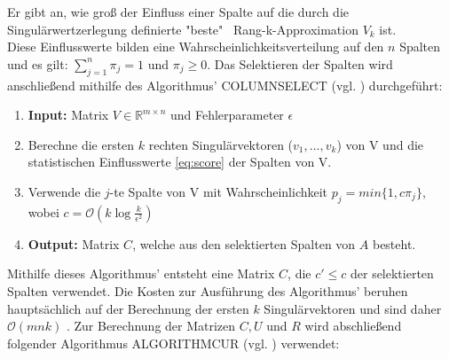 \documentclass[12pt,a4paper,twoside]{article}
\begin{document}
		Er gibt an, wie groß der Einfluss einer Spalte auf die durch die Singulärwertzerlegung definierte "beste" \ Rang-k-Approximation $V_k$ ist. \\
		Diese Einflusswerte bilden eine Wahrscheinlichkeitsverteilung auf den $n$ Spalten und es gilt: $\sum_{j=1}^n\pi_j=1$ und $\pi_j\geq 0$. \newline
		Das Selektieren der Spalten wird anschließend mithilfe des Algorithmus' COLUMNSELECT (vgl. \citep{mahoney2008}) durchgeführt: 
		\begin{enumerate}
			\item \textbf{Input:} Matrix $V\in \mathds{R}^{m\times n}$ und Fehlerparameter $\epsilon$
			\item Berechne die ersten $k$ rechten Singulärvektoren ($v_1,...,v_k$) von V und die statistischen Einflusswerte \ref{eq:score} der Spalten von V.
			\item Verwende die $j$-te Spalte von V mit Wahrscheinlichkeit $p_j=min\{1,c\pi_j\}$, wobei $c=\mathcal{O}(k \log \frac{k}{\epsilon^2})$
			\item \textbf{Output:} Matrix $C$, welche aus den selektierten Spalten von $A$ besteht.
		\end{enumerate}
		Mithilfe dieses Algorithmus' entsteht eine Matrix $C$, die $c'\leq c$ der selektierten Spalten verwendet. Die 
		Kosten zur Ausführung des Algorithmus' beruhen hauptsächlich auf der Berechnung der ersten $k$ 
		Singulärvektoren und sind daher $\mathcal{O}(mnk)$ \citep{mahoney2008}.\newline
		Zur Berechnung der Matrizen $C,U$ und $R$ wird abschließend folgender Algorithmus ALGORITHMCUR (vgl. \citep{mahoney2008}) verwendet: \newline
		\newline%
\end{document}
